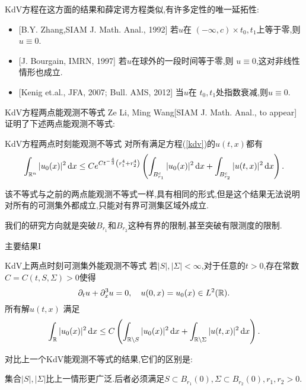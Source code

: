 \begin{frame}[t]
  KdV方程在这方面的结果和薛定谔方程类似,有许多定性的唯一延拓性:
  \begin{itemize}
    \item {}[B.Y. Zhang,SIAM J. Math. Anal., 1992] 若$u$在 $(-\infty,c)\times {t_0,t_1}$上等于零,则$u\equiv 0$.
    \item {}[J. Bourgain, IMRN, 1997] 若$u$在球外的一段时间等于零,则 $u\equiv 0$,这对非线性情形也成立.
    \item {}[Kenig et.al., JFA, 2007; Bull. AMS, 2012] 当$u$在 $t_0,t_1$处指数衰减,则$u\equiv 0$.
  \end{itemize}
\end{frame}
\begin{frame}[t]{KdV方程两点能观测不等式}
  Ze Li, Ming Wang[SIAM J. Math. Anal., to appear]证明了下述两点能观测不等式:
  \begin{alertblock}{KdV方程两点时刻能观测不等式} 
    对所有满足方程(\ref{kdv})的$u(t,x)$都有
  \begin{equation}
    \int_{\mathbb{R}^{n}}|u_0(x)|^2\,\mathrm{d}x\le Ce^{Ct ^{-\frac{4}{3}}\left(r_1^4+r_2^4\right)}\left( \int_{B_{r_1}^c}|u_0(x)|^2\,\mathrm{d}x+\int_{B_{r_2}^c}|u(t,x)|^2 \,\mathrm{d}x \right).\label{kdv-obs-old}
  \end{equation}
\end{alertblock}
  该不等式与之前的两点能观测不等式一样,具有相同的形式,但是这个结果无法说明对所有的可测集外都成立,只能对有界可测集区域外成立.
  
  我们的研究方向就是突破$B_{r_1}$和$B_{r_2}$这种有界的限制,甚至突破有限测度的限制. 
\end{frame}
\begin{frame}[t]{主要结果I}
  \begin{alertblock}{KdV上两点时刻可测集外能观测不等式}
    若$|S|,|\Sigma|<\infty$,对于任意的$t>0$,存在常数 $C=C(t,S,\Sigma)>0$使得
    \[ 
    \partial_t u +\partial_x^3u=0,\quad u(0,x)=u_0(x)\in L^2(\mathbb{R}).
    \] 
    所有解$u(t,x)$ 满足
  \begin{equation}\label{obkdv}
    \int_{\mathbb{R}}|u_0(x)|^2\,\mathrm{d}x\le C \left( \int_{\mathbb{R}\setminus S}|u_0(x)|^2\,\mathrm{d}x + \int_{\mathbb{R}\setminus \Sigma} |u(t,x)|^2\,\mathrm{d}x  \right). 
  \end{equation}
  \end{alertblock}
  对比上一个KdV能观测不等式的结果,它们的区别是:
  \begin{alertblock}{}
    集合$|S|,|\Sigma|$比上一情形更广泛.后者必须满足$S\subset B_{r_1}(0),\Sigma\subset B_{r_2}(0),r_1,r_2>0$.
  \end{alertblock}
\end{frame}


